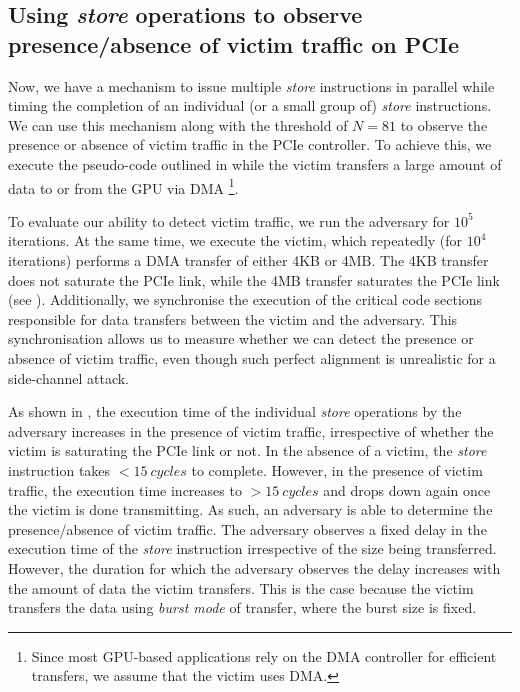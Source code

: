 \subsection{Using \textit{store} operations to observe presence/absence of victim traffic on PCIe}
\label{subsec:interconnect-sc-store-ops-measuring-time}
Now, we have a mechanism to issue multiple \textit{store} instructions in parallel while timing the completion of an individual (or a small group of) \textit{store} instructions.
We can use this mechanism along with the threshold of $N = 81$ to observe the presence or absence of victim traffic in the PCIe controller.
To achieve this, we execute the pseudo-code outlined in  while the victim transfers a large amount of data to or from the GPU via DMA
\footnote{Since most GPU-based applications rely on the DMA controller for efficient transfers, we assume that the victim uses DMA.}.

To evaluate our ability to detect victim traffic, we run the adversary for $10^5$ iterations.
At the same time, we execute the victim, which repeatedly (for $10^4$ iterations) performs a DMA transfer of either 4KB or 4MB.
The 4KB transfer does not saturate the PCIe link, while the 4MB transfer saturates the PCIe link (see ).
Additionally, we synchronise the execution of the critical code sections responsible for data transfers between the victim and the adversary. 
This synchronisation allows us to measure whether we can detect the presence or absence of victim traffic, even though such perfect alignment is unrealistic for a side-channel attack.

As shown in , the execution time of the individual \textit{store} operations by the adversary increases in the presence of victim traffic, irrespective of whether the victim is saturating the PCIe link or not.
In the absence of a victim, the \textit{store} instruction takes $<15~cycles$ to complete. However, in the presence of victim traffic, the execution time increases to $>15~cycles$ and drops down again once the victim is done transmitting.
As such, an adversary is able to determine the presence/absence of victim traffic.
The adversary observes a fixed delay in the execution time of the \textit{store} instruction irrespective of the size being transferred.
However, the duration for which the adversary observes the delay increases with the amount of data the victim transfers.
This is the case because the victim transfers the data using \textit{burst mode} of transfer, where the burst size is fixed.


